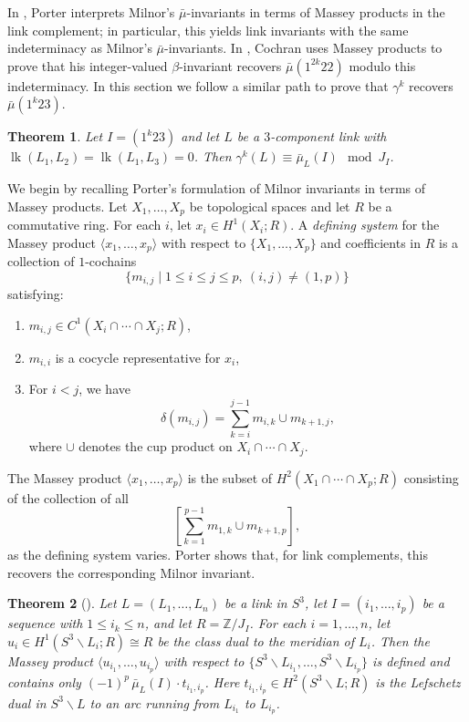 \documentclass[a4paper, 11pt]{amsart}
\newtheorem{theorem}{Theorem}[section]
\theoremstyle{definition}
\newcommand{\Z}{\mathbb{Z}}
\newcommand{\lk}{\operatorname{lk}}
\begin{document}
In \cite{Porter80}, Porter interprets Milnor's $\bar{\mu}$-invariants in terms of Massey products in the link complement; in particular, this yields link invariants with the same indeterminacy as Milnor's $\bar{\mu}$-invariants. In \cite[Theorem~6.10]{Coc90}, Cochran uses Massey products to prove that his integer-valued $\beta$-invariant recovers $\bar{\mu}(1^{2k}22)$ modulo this indeterminacy. In this section we follow a similar path to prove that $\gamma^k$ recovers $\bar{\mu}(1^{k}23)$.

\begin{theorem}\label{thm: gamma as Milnor}
Let $I=(1^k23)$ and let $L$ be a $3$-component link with $\lk(L_1,L_2)=\lk(L_1,L_3)=0$. Then $\gamma^k(L)\equiv \bar{\mu}_L(I)\mod J_I$.
\end{theorem}

We begin by recalling Porter's formulation of Milnor invariants in terms of Massey products.
Let $X_1,\dots,X_p$ be topological spaces and let $R$ be a commutative ring. For each $i$,
let $x_i\in H^1(X_i;R)$.
A \emph{defining system} for the Massey product $\langle x_1,\dots,x_p\rangle$ with respect to
$\{X_1,\dots,X_p\}$ and coefficients in $R$ is a collection of $1$-cochains
\[
\{m_{i,j}\mid 1\le i\le j\le p,\ (i,j)\neq (1,p)\}
\]
satisfying:
\begin{enumerate}
\item $m_{i,j}\in C^1(X_i\cap\cdots\cap X_j;R)$,
\item $m_{i,i}$ is a cocycle representative for $x_i$,
\item For $i<j$, we have
\[
\delta(m_{i,j})=\sum_{k=i}^{j-1} m_{i,k}\cup m_{k+1,j},
\]
where $\cup$ denotes the cup product on $X_i\cap\cdots\cap X_j$.
\end{enumerate}
The Massey product $\langle x_1,\dots,x_p\rangle$ is the subset of
$H^2(X_1\cap\cdots\cap X_p;R)$ consisting of the collection of all
\[
\left[\sum_{k=1}^{p-1} m_{1,k}\cup m_{k+1,p}\right],
\]
as the defining system varies. Porter shows that, for link complements, this recovers the
corresponding Milnor invariant.

\begin{theorem}[{\cite[Theorem~3]{Porter80}}]\label{thm: Porter}
Let $L=(L_1,\ldots, L_n)$ be a link in $S^3$, let $I=(i_1,\dots,i_p)$ be a sequence with
$1\le i_k\le n$, and let $R=\Z/J_I$. For each $i=1,\dots,n$, let
$u_i\in H^1(S^3\smallsetminus L_i;R)\cong R$ be the class dual to the meridian of $L_i$.
Then the Massey product $\langle u_{i_1},\dots,u_{i_p}\rangle$ with respect to
$\{S^3\smallsetminus L_{i_1},\dots,S^3\smallsetminus L_{i_p}\}$ is defined and contains only
$(-1)^p\,\bar{\mu}_L(I)\cdot t_{i_1,i_p}$. Here $t_{i_1,i_p}\in H^2(S^3\smallsetminus L;R)$ is the
Lefschetz dual in $S^3\smallsetminus L$ to an arc running from $L_{i_1}$ to $L_{i_p}$.
\end{theorem}
\end{document}
